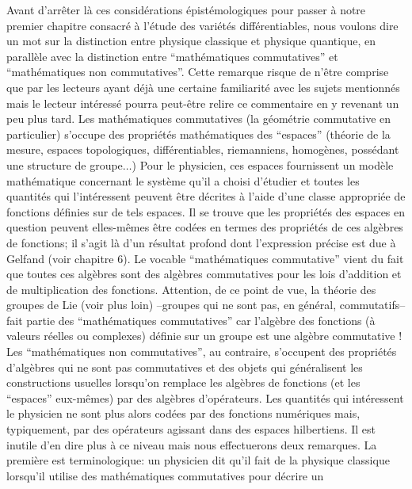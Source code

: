  Avant d'arr\^eter l\`a ces consid\'erations
\'epist\'emologiques pour passer \`a notre premier chapitre
consacr\'e \`a l'\'etude des vari\'et\'es diff\'erentiables, nous
voulons dire un mot sur la distinction entre physique classique et
physique quantique, en parall\`ele avec la distinction entre 
``math\'ematiques commutatives'' et ``math\'ematiques non
commutatives''. Cette remarque risque de n'\^etre comprise que par
les lecteurs ayant d\'ej\`a une certaine familiarit\'e avec les
sujets mentionn\'es mais le lecteur int\'eress\'e pourra peut-\^etre
relire ce commentaire en y revenant un peu plus tard.
Les math\'ematiques commutatives (la g\'eom\'etrie commutative en
particulier) s'occupe des propri\'et\'es math\'ematiques des
``espaces'' (th\'eorie de la mesure, espaces topologiques,
diff\'erentiables, riemanniens, homog\`enes, poss\'edant une
structure de groupe$\ldots$) Pour le physicien, ces espaces
fournissent un mod\`ele math\'ematique concernant le syst\`eme qu'il a
choisi d'\'etudier et toutes les quantit\'es qui l'int\'eressent
peuvent \^etre d\'ecrites \`a l'aide d'une classe appropri\'ee de
fonctions d\'efinies sur de tels espaces. Il se trouve que les
propri\'et\'es des espaces en question peuvent elles-m\^emes \^etre
cod\'ees en termes des propri\'et\'es de ces alg\`ebres de
fonctions; il s'agit l\`a d'un r\'esultat profond dont l'expression
pr\'ecise est due \`a Gelfand (voir chapitre 6). Le vocable ``math\'ematiques
commutative'' vient du fait que toutes ces alg\`ebres sont des
alg\`ebres commutatives pour les lois d'addition et de multiplication
des fonctions. Attention, de ce point de vue, la th\'eorie des
groupes de Lie (voir plus loin) --groupes qui ne sont pas, en
g\'en\'eral, commutatifs-- fait partie des ``math\'ematiques
commutatives'' car l'alg\`ebre des fonctions (\`a valeurs r\'eelles
ou complexes) d\'efinie sur un groupe est une alg\`ebre commutative !
Les ``math\'ematiques non commutatives'', au contraire, s'occupent des
propri\'et\'es d'alg\`ebres qui ne sont pas commutatives et des
objets qui g\'en\'eralisent les constructions usuelles lorsqu'on
remplace les alg\`ebres de fonctions (et les ``espaces'' eux-m\^emes)
par des alg\`ebres d'op\'erateurs. Les quantit\'es qui int\'eressent
le physicien ne sont plus alors cod\'ees par des fonctions
num\'eriques mais, typiquement, par des op\'erateurs agissant dans
des espaces hilbertiens. Il est inutile d'en dire plus \`a ce niveau
mais nous effectuerons deux remarques. La premi\`ere est
terminologique: un physicien dit qu'il fait de la physique classique
lorsqu'il utilise des math\'ematiques commutatives pour d\'ecrire un
